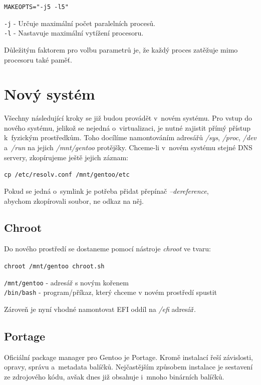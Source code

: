 \documentclass[12pt,a4paper,twoside,]{article}
\begin{document}
{{{{{{{\texttt{MAKEOPTS="-j5 -l5"}

\hspace{-1.5em}\texttt{-j} - Určuje maximální počet paralelních procesů.\\
\texttt{-l} - Nastavuje maximální vytížení procesoru.

\hspace{-1.5em}Důležitým faktorem pro volbu parametrů je, že každý proces zatěžuje mimo procesoru také paměť.

\newpage
\section{\textsf{Nový systém}}
Všechny následující kroky se již budou provádět v~novém systému.
Pro vstup do nového systému, jelikož se nejedná o~virtualizaci, je nutné zajistit přímý přístup k~fyzickým prostředkům.
Toho docílíme namontováním adresářů \textit{/sys}, \textit{/proc}, \textit{/dev} a~\textit{/run} na jejich \textit{/mnt/gentoo} protějšky. Chceme-li v~novém 
systému stejné DNS servery, zkopírujeme ještě jejich záznam: 

\texttt{cp /etc/resolv.conf /mnt/gentoo/etc} 

\hspace{-1.5em}Pokud se jedná o~symlink je potřeba přidat přepínač  \textit{--dereference}, \\
abychom zkopírovali soubor, ne odkaz na něj. 
\subsection{\textsf{Chroot}}
Do nového prostředí se dostaneme pomocí nástroje \textit{chroot} ve tvaru:

\texttt{chroot /mnt/gentoo chroot.sh}

\hspace{-1.5em}\texttt{/mnt/gentoo} - adresář s novým kořenem\\
\texttt{/bin/bash} - program/příkaz, který chceme v novém prostředí spustit

\hspace{-1.5em}Zároveň je nyní vhodné namontovat EFI oddíl na \textit{/efi} adresář.
\subsection{\textsf{Portage}}
Oficiální package manager pro Gentoo je Portage. Kromě instalací řeší závislosti, opravy, správu a~metadata balíčků.
Nejčastějším způsobem instalace je sestavení ze zdrojového kódu, avšak dnes již obsahuje i~mnoho binárních balíčků.
}}}}}}}
\end{document}

